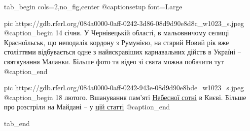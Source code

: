  
 
 
 
 


\ifcmt
  tab_begin cols=2,no_fig,center
		 @captionsetup font=Large

     pic https://gdb.rferl.org/084a0000-0aff-0242-3d86-08d9d90e8d8c_w1023_s.jpeg
		 @caption_begin
14 січня. У Чернівецькій області, в мальовничому селищі Красноїльськ, що
неподалік кордону з Румунією, на старий Новий рік вже століттями
відбувається одне з найяскравіших карнавальних дійств в Україні –
святкування Маланки. Більше фото та відео зі свята можна побачити 
\href{https://www.radiosvoboda.org/a/31048285.html}{тут} 
		 @caption_end

		 pic https://gdb.rferl.org/084a0000-0aff-0242-943e-08d9d90e8bde_w1023_s.jpeg
		 @caption_begin
18 лютого. Вшанування пам'яті
\href{https://www.radiosvoboda.org/a/photo-nebesna-sotnya-vshanuvannya-kyiv/31109687.html}{Небесної
сотні} в Києві. Більше про розстріли на Майдані – у \href{https://www.radiosvoboda.org/a/dbr-i-henprokuror-pro-zavershennya-rozsliduvannya-rozstriliv-na-maydani/31564810.html}{цій статті}
		 @caption_end

  tab_end
\fi
